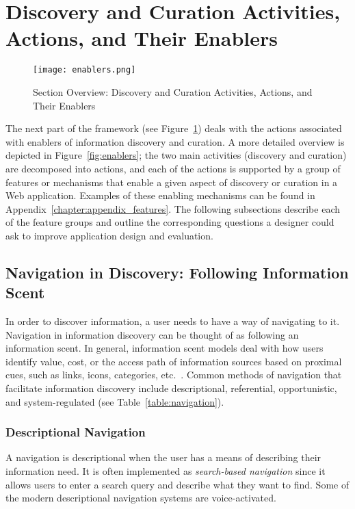 {\section{Discovery and Curation Activities, Actions, and Their Enablers}
\label{section:enablers}

\begin{figure}[ht!]
	\noindent
	\centering
	\texttt{[image: enablers.png]}
	\caption{Section Overview: Discovery and Curation Activities, Actions, and Their Enablers}
	\label{fig:enablers_overview} 
\end{figure}
The next part of the framework (see Figure~\ref{fig:enablers_overview}) deals with the actions associated with enablers of information discovery and curation. A more detailed overview is depicted in Figure~\ref{fig:enablers}; the two main activities (discovery and curation) are decomposed into actions, and each of the actions is supported by a group of features or mechanisms that enable a given aspect of discovery or curation in a Web application. Examples of these enabling mechanisms can be found in Appendix~\ref{chapter:appendix_features}. The following subsections describe each of the feature groups and outline the corresponding questions a designer could ask to improve application design and evaluation.  

{\subsection{Navigation in Discovery: Following Information Scent}
In order to discover information, a user needs to have a way of navigating to it. Navigation in information discovery can be thought of as following an information scent. In general, information scent models deal with how users identify value, cost, or the access path of information sources based on proximal cues, such as links, icons, categories, etc.~\cite{pirolli1999information}. Common methods of navigation that facilitate information discovery include descriptional, referential, opportunistic, and system-regulated (see Table~\ref{table:navigation}). 

{\subsubsection{Descriptional Navigation}
A navigation is descriptional when the user has a means of describing their information need. It is often implemented as \textit{search-based navigation} since it allows users to enter a search query and describe what they want to find. Some of the modern descriptional navigation systems are voice-activated. 

}}}
